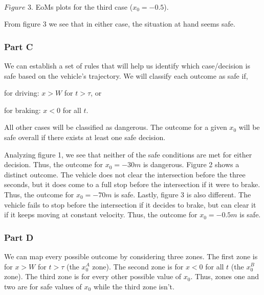 \documentclass[11pt]{article}
\begin{document}
    \begin{center}
    \end{center}
    { \hspace*{\fill} \\}
    
    \(Figure\) 3. EoMs plots for the third case (\(x_0=-0.5\)).

    From figure 3 we see that in either case, the situation at hand seems
safe.

    \subsubsection{Part C}\label{part-c}

    We can establish a set of rules that will help us identify which
case/decision is safe based on the vehicle's trajectory. We will
classify each outcome as safe if,

for driving: \(x>W\) for \(t>\tau\), or

for braking: \(x<0\) for all \(t\).

All other cases will be classified as dangerous. The outcome for a given
\(x_0\) will be safe overall if there exists at least one safe decision.

    Analyzing figure 1, we see that neither of the safe conditions are met
for either decision. Thus, the outcome for \(x_0=-30m\) is dangerous.
Figure 2 shows a distinct outcome. The vehicle does not clear the
intersection before the three seconds, but it does come to a full stop
before the intersection if it were to brake. Thus, the outcome for
\(x_0=-70m\) is safe. Lastly, figure 3 is also different. The vehicle
fails to stop before the intersection if it decides to brake, but can
clear it if it keeps moving at constant velocity. Thus, the outcome for
\(x_0=-0.5m\) is safe.

    \subsubsection{Part D}\label{part-d}

    We can map every possible outcome by considering three zones. The first
zone is for \(x > W\) for \(t>\tau\) (the \(x_0^A\) zone). The second
zone is for \(x<0\) for all \(t\) (the \(x_0^B\) zone). The third zone
is for every other possible value of \(x_0\). Thus, zones one and two
are for safe values of \(x_0\) while the third zone isn't.
\end{document}
